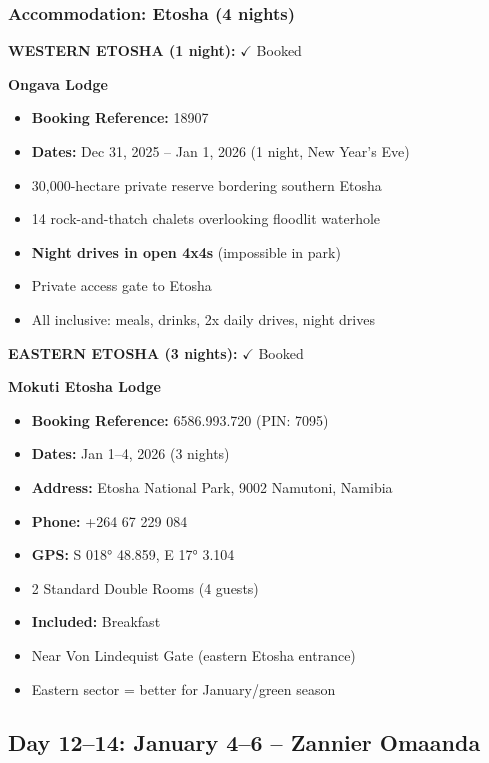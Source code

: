 \documentclass[11pt]{article}
\newcommand{\booked}{\textcolor{accentcolor}{$\checkmark$ Booked}}
\begin{document}
\subsubsection{Accommodation: Etosha (4 nights)}

\textbf{WESTERN ETOSHA (1 night):} \booked

\textbf{Ongava Lodge}
\begin{itemize}
    \item \textbf{Booking Reference:} 18907
    \item \textbf{Dates:} Dec 31, 2025 -- Jan 1, 2026 (1 night, New Year's Eve)
    \item 30,000-hectare private reserve bordering southern Etosha
    \item 14 rock-and-thatch chalets overlooking floodlit waterhole
    \item \textbf{Night drives in open 4x4s} (impossible in park)
    \item Private access gate to Etosha
    \item All inclusive: meals, drinks, 2x daily drives, night drives
\end{itemize}

\textbf{EASTERN ETOSHA (3 nights):} \booked

\textbf{Mokuti Etosha Lodge}
\begin{itemize}
    \item \textbf{Booking Reference:} 6586.993.720 (PIN: 7095)
    \item \textbf{Dates:} Jan 1--4, 2026 (3 nights)
    \item \textbf{Address:} Etosha National Park, 9002 Namutoni, Namibia
    \item \textbf{Phone:} +264 67 229 084
    \item \textbf{GPS:} S 018° 48.859, E 17° 3.104
    \item 2 Standard Double Rooms (4 guests)
    \item \textbf{Included:} Breakfast
    \item Near Von Lindequist Gate (eastern Etosha entrance)
    \item Eastern sector = better for January/green season
\end{itemize}


\clearpage
\subsection{Day 12--14: January 4--6 -- Zannier Omaanda}
\end{document}
